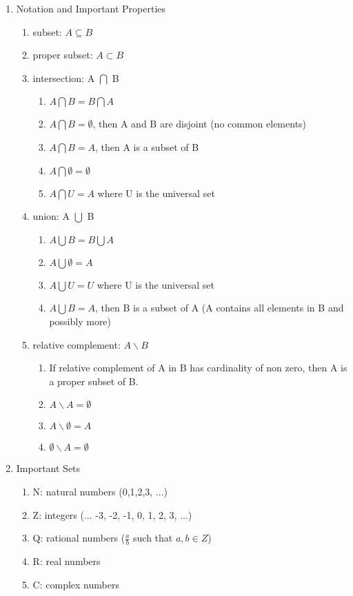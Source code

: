 \documentclass[11pt]{article}
\begin{document}
\begin{enumerate}
\item Notation and Important Properties
\begin{enumerate}
\item subset: $A \subseteq B $
\item proper subset: $A \subset B$ 
\item intersection: A $\bigcap$ B
\begin{enumerate}
\item $A \bigcap B = B \bigcap A$
\item $A \bigcap B = \emptyset$, then A and B are disjoint (no common elements)
\item $A \bigcap B = A $, then A is a subset of B
\item $A \bigcap \emptyset = \emptyset$
\item $A \bigcap U = A$ where U is the universal set
\end{enumerate}
\item union: A $\bigcup$ B
\begin{enumerate}
\item $A \bigcup B = B \bigcup A$
\item $A \bigcup \emptyset = A$
\item $A \bigcup U = U$ where U is the universal set
\item $A \bigcup B = A$, then B is a subset of A (A contains all elements in B and possibly more)
\end{enumerate}
\item relative complement: $A \backslash B$
\begin{enumerate}
\item 
If relative complement of A in B has cardinality of non zero, then A is a proper subset of B.
\item
$A \backslash A = \emptyset$
\item
$A \backslash \emptyset = A$
\item
$\emptyset \backslash A = \emptyset$
\end{enumerate}
\end{enumerate}

\item Important Sets
\begin{enumerate}
\item
N: natural numbers (0,1,2,3, ...)
\item 
Z: integers (... -3, -2, -1, 0, 1, 2, 3, ...)
\item
Q: rational numbers ($\frac{a}{b}$ such that $a,b \in Z$)
\item
R: real numbers
\item
C: complex numbers
\end{enumerate}
\end{enumerate}
\end{document}
